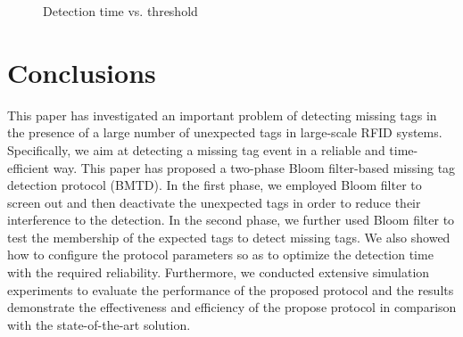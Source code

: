 \documentclass[10pt, twocolumn]{IEEEtran}
\begin{document}
\begin{figure}[htbp]
\centering
{}
\caption{Detection time vs. threshold}
\label{Fig:T_M}
\end{figure}


\section{Conclusions}
\label{sec:conclusion}
This paper has investigated an important problem of detecting missing tags in the presence of a large number of unexpected tags in large-scale RFID systems. Specifically, we aim at detecting a missing tag event in a reliable and time-efficient way. This paper has proposed a two-phase Bloom filter-based missing tag detection protocol (BMTD). In the first phase, we employed Bloom filter to screen out and then deactivate the unexpected tags in order to reduce their interference to the detection. In the second phase, we further used Bloom filter to test the membership of the expected tags to detect missing tags. We also showed how to configure the protocol parameters so as to optimize the detection time with the required reliability. Furthermore, we conducted extensive simulation experiments to evaluate the performance of the proposed protocol and the results demonstrate the effectiveness and efficiency of the propose protocol in comparison with the state-of-the-art solution.




\end{document}
